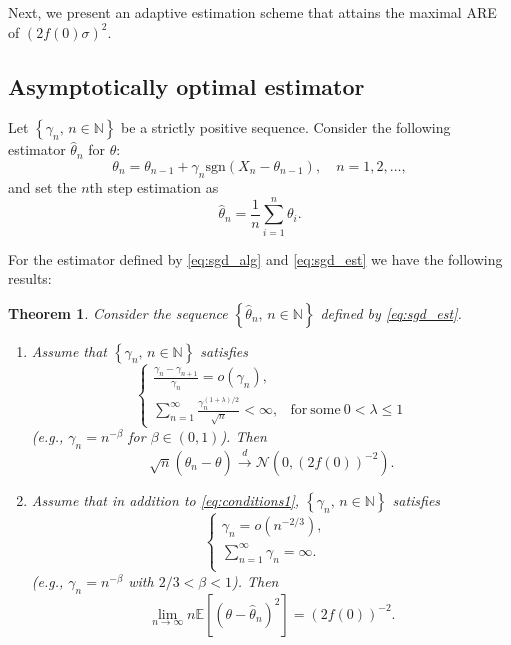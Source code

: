 \documentclass[letterpaper, conference, 11pt]{IEEEtran}      %
\newtheorem{thm}{\bf{Theorem}}
\newcommand{\sgn}{\mathrm{sgn} }
\begin{document}
Next, we present an adaptive estimation scheme that attains the maximal ARE of $(2f(0)\sigma)^2$. 

\subsection{Asymptotically optimal estimator}
Let $\left\{ \gamma_n,\, n\in \mathbb N \right\}$ be a strictly positive sequence. Consider the following estimator $\hat{\theta}_n$ for $\theta$:  
\begin{equation}
\label{eq:sgd_alg}
\theta_n = \theta_{n-1} +  \gamma_n \sgn (X_n - \theta_{n-1}), \quad n = 1,2,\ldots,
\end{equation}
and set the $n$th step estimation as
\begin{equation} \label{eq:sgd_est}
\hat{\theta}_n =  \frac{1}{n} \sum_{i=1}^n  \theta_i. 
\end{equation}

For the estimator defined by \eqref{eq:sgd_alg} and \eqref{eq:sgd_est} we have the following results:
\begin{thm} \label{thm:sgd}
Consider the sequence $\left\{\hat{\theta}_n,\, n\in \mathbb N \right\}$ defined by \eqref{eq:sgd_est}. 
\begin{enumerate}
\item[(i)] Assume that $\left\{ \gamma_n,\, n\in \mathbb N \right\}$ satisfies
\begin{equation} \label{eq:conditions1}
\begin{cases}
\frac{\gamma_n - \gamma_{n+1}}{\gamma_n} = o(\gamma_n), &  \\
\sum_{n=1}^\infty \frac{\gamma_n^{(1+\lambda)/2}} {\sqrt{n}} < \infty, & 
\mathrm{for~some~}0< \lambda \leq 1
\end{cases}
\end{equation}
(e.g., $\gamma_n = n^{-\beta}$ for $\beta \in (0,1)$). Then
\[
\sqrt{n} \left( \hat{\theta}_n - \theta \right) \overset{d}{\rightarrow} \mathcal N \left(0,  \left( 2 f(0)\right)^{-2} \right).
\]
\item[(ii)] Assume that in addition to \eqref{eq:conditions1}, $\left\{ \gamma_n,\, n\in \mathbb N \right\}$ satisfies
\begin{equation} \label{eq:conditions2}
\begin{cases}
\gamma_n = o(n^{-2/3}), &  \\
\sum_{n=1}^\infty \gamma_n = \infty.  & \\
\end{cases}
\end{equation}
(e.g., $\gamma_n = n^{-\beta}$ with $2/3<\beta<1$). Then
\[
\lim_{n\rightarrow \infty} n\mathbb E \left[ \left(\theta-\hat{\theta}_n \right)^2 \right] = \left( 2 f(0)\right)^{-2}. 
\]
\end{enumerate}
\end{thm}
\end{document}
